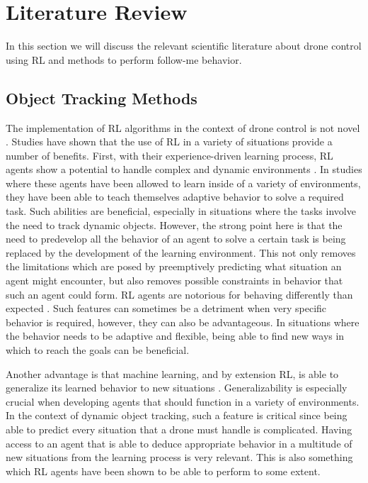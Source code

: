 \section{Literature Review}
In this section we will discuss the relevant scientific literature about 
drone control using RL and methods to perform follow-me behavior. 

\subsection{Object Tracking Methods} \label{baselineliterature}
The implementation of RL algorithms in the context of drone control 
is not novel \cite{FrontalViewRL, DroneRLUsingTransferLearning, iowamasterthesis,AirSimDroneNavigation, 
DeepRLforNavUsingSensor, RLfortakeoff, RLenLSTMfordrone}. 
Studies have shown that the use of RL in a variety of situations provide a 
number of benefits. First, with their experience-driven learning process, RL agents 
show a potential to handle complex and dynamic environments \cite{DeepRLforNavUsingSensor}.
In studies where these agents have been allowed to learn inside of a variety of environments, 
they have been able to teach themselves adaptive behavior to solve a required task. 
Such abilities are beneficial, especially in situations where the tasks involve 
the need to track dynamic objects. However, the 
strong point here is that the need to predevelop all the behavior of an agent to 
solve a certain task is being replaced by the development of the learning environment. This 
not only removes the limitations which are posed by preemptively predicting what situation an 
agent might encounter, but also removes possible constraints in behavior that such an agent could 
form. RL agents are notorious for behaving differently than expected \cite{rlisweird}.
Such features can sometimes be a detriment when very specific behavior is required, 
however, they can also be advantageous. In situations where the behavior needs to be adaptive 
and flexible, being able to find new ways in which to reach the goals can be beneficial. 

Another advantage is that machine learning, and by extension RL, is able to generalize 
its learned behavior to new situations \cite{RLenLSTMfordrone}. Generalizability is 
especially crucial when developing agents that should function in a variety of 
environments. In the context of dynamic object tracking, such a feature is critical since 
being able to predict every situation that a drone must handle is complicated. 
Having access to an agent that is able to deduce appropriate behavior in 
a multitude of new situations from the learning process is very relevant. This is 
also something which RL agents have been shown to be able to 
perform to some extent. 

